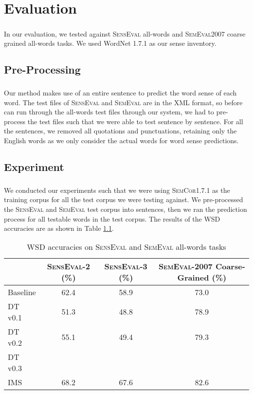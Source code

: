 \chapter{Evaluation}
\label{evaluation}
\paragraph{}
In our evaluation, we tested against \textsc{SensEval} all-words and \textsc{SemEval2007} coarse grained all-words tasks. We used WordNet 1.7.1 as our sense inventory.

\section{Pre-Processing}
\paragraph{}
Our method makes use of an entire sentence to predict the word sense of each word. The test files of \textsc{SensEval} and \textsc{SemEval} are in the XML format, so before can run through the all-words test files through our system, we had to pre-process the test files such that we were able to test sentence by sentence. For all the sentences, we removed all quotations and punctuations, retaining only the English words as we only consider the actual words for word sense predictions.

\section{Experiment}
\paragraph{}
We conducted our experiments such that we were using \textsc{SemCor1.7.1} as the training corpus for all the test corpus we were testing against. We pre-processed the \textsc{SensEval} and \textsc{SemEval} test corpus into sentences, then we ran the prediction process for all testable words in the test corpus. The results of the WSD accuracies are as shown in Table \ref{tab:resultsSum}.

\begin{table}
	\begin{tabular}[c]{| l | c | c | c |}
		\hline
		& \textsc{SensEval-2} (\%) & \textsc{SensEval-3} (\%) & \textsc{SemEval-2007} Coarse-Grained (\%) \\
		\hline
		Baseline & 62.4 & 58.9 & 73.0 \\
		\hline
		DT v0.1 & 51.3 & 48.8 & 78.9 \\
		\hline
		DT v0.2 & 55.1 & 49.4 & 79.3 \\
		\hline
		DT v0.3 & & & \\
		\hline
		IMS & 68.2 & 67.6 & 82.6 \\
		\hline
	\end{tabular}
	\caption{WSD accuracies on \textsc{SensEval} and \textsc{SemEval} all-words tasks}
	\label{tab:resultsSum}
\end{table}

